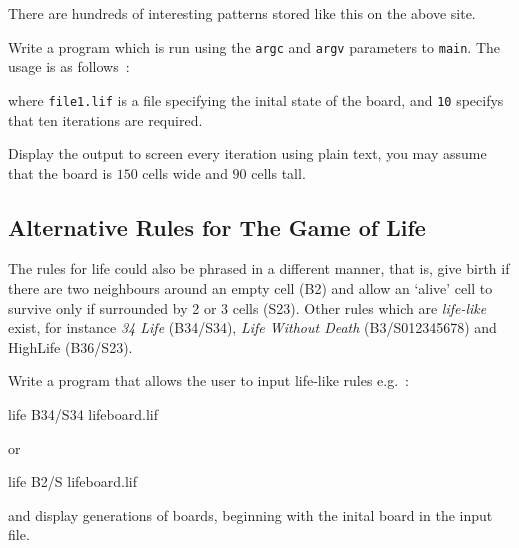 There are hundreds of interesting patterns stored like this
on the above site.

\begin{exercise}
\label{ex:life106}
Write a program which is run using the \verb^argc^ and
\verb^argv^ parameters to \verb^main^. The usage is
as follows~:
\begin{terminaloutput}
\end{terminaloutput}
where \verb^file1.lif^ is a file specifying the inital
state of the board, and \verb^10^ specifys that ten
iterations are required.

Display the output to screen every iteration using plain text,
you may assume that the board is $150$ cells wide and $90$ cells tall.
\end{exercise}

\subsection*{Alternative Rules for The Game of Life}

The rules for life could also be phrased in a different manner, that
is, give birth if there are two neighbours around an empty cell (B2)
and allow an `alive' cell to survive only if surrounded by 2 or 3 cells (S23).
Other rules which are {\it life-like} exist,
for instance {\it 34 Life} (B34/S34), {\it Life Without Death} (B3/S012345678)
and {HighLife} (B36/S23).

\begin{exercise}
Write a program that allows the user to input life-like rules e.g.~:
\begin{terminaloutput}
life B34/S34 lifeboard.lif
\end{terminaloutput}
or
\begin{terminaloutput}
life B2/S lifeboard.lif
\end{terminaloutput}
and display generations of boards, beginning with the inital board in
the input file.
\end{exercise}
